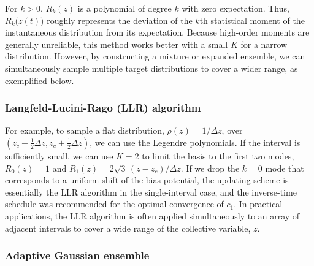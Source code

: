 \documentclass[reprint, superscriptaddress, floatfix]{revtex4-1}
\begin{document}
For $k > 0$, $R_k(z)$ is a polynomial of degree $k$ with zero expectation.
%
Thus, $R_k\bigl(z(t)\bigr)$ roughly
represents the deviation of the $k$th statistical moment
of the instantaneous distribution
from its expectation.
Because high-order moments are generally unreliable,
this method works better with a small $K$ for a narrow distribution.
%
However, by constructing
a mixture or expanded ensemble\cite{swendsen1986,
  *geyer1991, *hukushima1996, *hansmann1997, *sugita1999,
  *earl2005, *zuckerman2011, *rauscher2009,
  neuhaus2006, *neuhaus2007, kim2010,
  marinari1992,
  *lyubartsev1992, li2007,
  park2007, *nguyen2013, *zhang2015st, shirts2017},
we can simultaneously sample multiple target distributions
to cover a wider range, as exemplified below.


\subsubsection{Langfeld-Lucini-Rago (LLR) algorithm}

For example,
to sample a flat distribution, $\rho(z) = 1/\Delta z$,
over $\left(z_c - \frac 1 2 \Delta z, z_c + \frac 1 2 \Delta z\right)$,
we can use the Legendre polynomials\cite{arfken}.
%
If the interval is sufficiently small,
we can use $K = 2$ to limit the basis to the first two modes,
$R_0(z) = 1$ and $R_1(z) = 2 \sqrt{3} \, (z - z_c)/\Delta z$.
%
If we drop the $k = 0$ mode
that corresponds to a uniform shift of the bias potential,
the updating scheme is essentially the LLR algorithm\cite{langfeld2012}
in the single-interval case,
and the inverse-time schedule
was recommended for the optimal convergence of $c_1$.\cite{pellegrini2014}
%
In practical applications,
the LLR algorithm is often applied simultaneously
to an array of adjacent intervals
to cover a wide range of the collective variable, $z$.\cite{langfeld2012, pellegrini2014}
%



\subsubsection{\label{sec:age}
Adaptive Gaussian ensemble}
\end{document}
